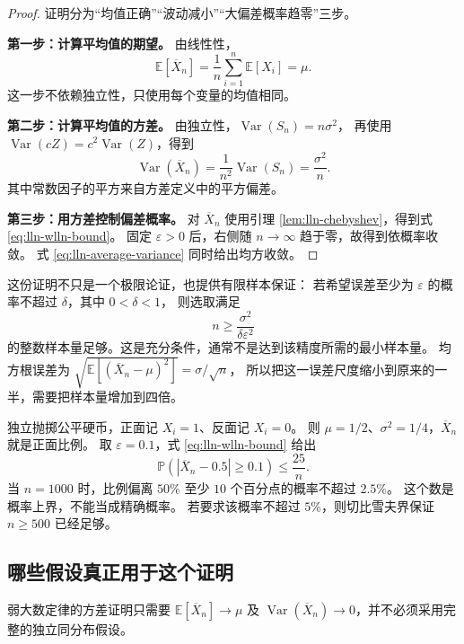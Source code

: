 \documentclass[UTF8,12pt,a4paper,fontset=fandol]{ctexart}
\begin{document}
\begin{proof}
证明分为“均值正确”“波动减小”“大偏差概率趋零”三步。

\textbf{第一步：计算平均值的期望。}
由线性性，
\[
  \mathbb E[\overline X_n]
  =\frac1n\sum_{i=1}^n\mathbb E[X_i]=\mu.
\]
这一步不依赖独立性，只使用每个变量的均值相同。

\textbf{第二步：计算平均值的方差。}
由独立性，$\operatorname{Var}(S_n)=n\sigma^2$，
再使用 $\operatorname{Var}(cZ)=c^2\operatorname{Var}(Z)$，得到
\begin{equation}
  \operatorname{Var}(\overline X_n)
  =\frac1{n^2}\operatorname{Var}(S_n)
  =\frac{\sigma^2}{n}.
  \label{eq:lln-average-variance}
\end{equation}
其中常数因子的平方来自方差定义中的平方偏差。

\textbf{第三步：用方差控制偏差概率。}
对 $\overline X_n$ 使用引理 \ref{lem:lln-chebyshev}，得到式 \eqref{eq:lln-wlln-bound}。
固定 $\varepsilon>0$ 后，右侧随 $n\to\infty$ 趋于零，故得到依概率收敛。
式 \eqref{eq:lln-average-variance} 同时给出均方收敛。
\end{proof}

这份证明不只是一个极限论证，也提供有限样本保证：
若希望误差至少为 $\varepsilon$ 的概率不超过 $\delta$，其中 $0<\delta<1$，
则选取满足
\begin{equation}
  n\geq\frac{\sigma^2}{\delta\varepsilon^2}
  \label{eq:lln-sample-size}
\end{equation}
的整数样本量足够。这是充分条件，通常不是达到该精度所需的最小样本量。
均方根误差为
$\sqrt{\mathbb E[(\overline X_n-\mu)^2]}=\sigma/\sqrt n$，
所以把这一误差尺度缩小到原来的一半，需要把样本量增加到四倍。

\begin{example}[公平硬币的正面比例]
\label{ex:lln-coin-bound}
独立抛掷公平硬币，正面记 $X_i=1$、反面记 $X_i=0$。
则 $\mu=1/2$、$\sigma^2=1/4$，$\overline X_n$ 就是正面比例。
取 $\varepsilon=0.1$，式 \eqref{eq:lln-wlln-bound} 给出
\[
  \mathbb P(|\overline X_n-0.5|\geq0.1)\leq\frac{25}{n}.
\]
当 $n=1000$ 时，比例偏离 $50\%$ 至少 $10$ 个百分点的概率不超过 $2.5\%$。
这个数是概率上界，不能当成精确概率。
若要求该概率不超过 $5\%$，则切比雪夫界保证 $n\geq500$ 已经足够。
\end{example}

\subsection{哪些假设真正用于这个证明}

弱大数定律的方差证明只需要
$\mathbb E[\overline X_n]\to\mu$ 及
$\operatorname{Var}(\overline X_n)\to0$，并不必须采用完整的独立同分布假设。
\end{document}
